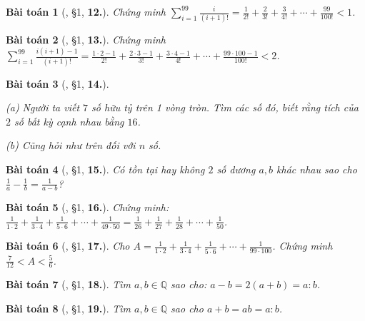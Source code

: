 \documentclass{article}
\numberwithin{equation}{section}
\newtheorem{baitoan}{Bài toán}[section]
\begin{document}
\begin{baitoan}[\cite{Binh_Toan_7_tap_1}, \S1, \textbf{12.}]
	Chứng minh $\sum_{i=1}^{99} \frac{i}{(i+1)!} = \frac{1}{2!} + \frac{2}{3!} + \frac{3}{4!} + \cdots + \frac{99}{100!} < 1$.
\end{baitoan}

\begin{baitoan}[\cite{Binh_Toan_7_tap_1}, \S1, \textbf{13.}]
	Chứng minh $\sum_{i=1}^{99} \frac{i(i + 1) - 1}{(i+1)!} = \frac{1\cdot 2 - 1}{2!} + \frac{2\cdot 3 - 1}{3!} + \frac{3\cdot 4 - 1}{4!} + \cdots + \frac{99\cdot 100 - 1}{100!} < 2$.
\end{baitoan}

\begin{baitoan}[\cite{Binh_Toan_7_tap_1}, \S1, \textbf{14.}]
	\begin{enumerate*}
		\item[(a)] Người ta viết $7$ số hữu tỷ trên 1 vòng tròn. Tìm các số đó, biết rằng tích của $2$ số bất kỳ cạnh nhau bằng $16$.
		\item[(b)] Cũng hỏi như trên đối với $n$ số.
	\end{enumerate*}
\end{baitoan}

\begin{baitoan}[\cite{Binh_Toan_7_tap_1}, \S1, \textbf{15.}]
	Có tồn tại hay không $2$ số dương $a,b$ khác nhau sao cho $\frac{1}{a} - \frac{1}{b} = \frac{1}{a - b}$?
\end{baitoan}

\begin{baitoan}[\cite{Binh_Toan_7_tap_1}, \S1, \textbf{16.}]
	Chứng minh: $\frac{1}{1\cdot 2} + \frac{1}{3\cdot 4} + \frac{1}{5\cdot 6} + \cdots + \frac{1}{49\cdot 50} = \frac{1}{26} + \frac{1}{27} + \frac{1}{28} + \cdots + \frac{1}{50}$.
\end{baitoan}

\begin{baitoan}[\cite{Binh_Toan_7_tap_1}, \S1, \textbf{17.}]
	Cho $A = \frac{1}{1\cdot 2} + \frac{1}{3\cdot 4} + \frac{1}{5\cdot 6} + \cdots + \frac{1}{99\cdot 100}$. Chứng minh $\frac{7}{12} < A < \frac{5}{6}$.
\end{baitoan}

\begin{baitoan}[\cite{Binh_Toan_7_tap_1}, \S1, \textbf{18.}]
	Tìm $a,b\in\mathbb{Q}$ sao cho: $a - b = 2(a + b) = a:b$.
\end{baitoan}

\begin{baitoan}[\cite{Binh_Toan_7_tap_1}, \S1, \textbf{19.}]
	Tìm $a,b\in\mathbb{Q}$ sao cho $a + b = ab = a:b$.
\end{baitoan}
\end{document}
